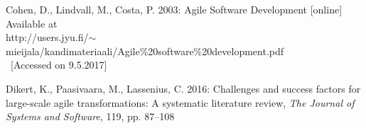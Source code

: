 
Cohen, D., Lindvall, M., Costa, P. 2003: Agile Software Development [online]
Available at \\
http://users.jyu.fi/$\sim$mieijala/kandimateriaali/Agile\%20software\%20development.pdf \\ [Accessed on 9.5.2017]

Dikert, K., Paasivaara, M., Lassenius, C. 2016: Challenges and success factors
for large-scale agile transformations: A systematic literature review,
\textit{The Journal of Systems and Software}, 119, pp. 87–108

